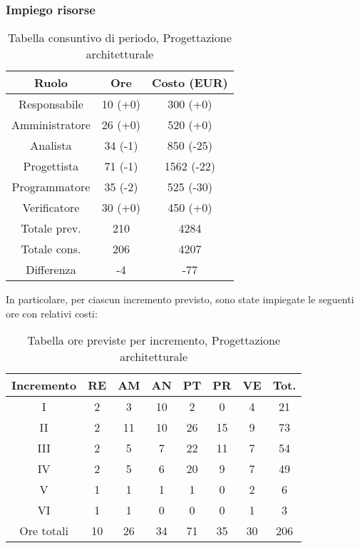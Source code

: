 \subsubsection{Impiego risorse}
\begin{table}[h]
\caption{Tabella consuntivo di periodo, Progettazione architetturale}  
\begin{center}
\begin{tabular}{ |c|c|c|  }
 \hline
 Ruolo 		& Ore & Costo (EUR)\\
 \hline\hline
	Responsabile	& 10 (+0) & 300 (+0)\\
	Amministratore	& 26 (+0) & 520 (+0)\\
	Analista		& 34 (-1) & 850 (-25)\\
	Progettista		& 71 (-1) & 1562 (-22)\\
	Programmatore	& 35 (-2) & 525 (-30)\\
	Verificatore	& 30 (+0) & 450 (+0)\\
	\hline\hline
	Totale prev.	& 210 & 4284 \\
	Totale cons.	& 206 & 4207 \\
	Differenza		& -4 & -77 \\
 \hline
\end{tabular}
\end{center}
\end{table}
\newpage
\noindent In particolare, per ciascun incremento previsto, sono state impiegate le seguenti ore con relativi costi:
\begin{table}[h]
	\caption{Tabella ore previste per incremento, Progettazione architetturale}  
	\begin{center}
		\begin{tabular}{ |c|c|c|c|c|c|c|c|  }
			\hline
			Incremento 		& RE 	& AM 	& AN 	& PT 	& PR 	& VE 	& Tot.\\
			\hline\hline
			I		& 2 		& 3			& 10 	& 2 	& 0 		& 4 		& 21\\
			II		& 2 		& 11 		& 10 	& 26	& 15 		& 9 		& 73\\
			III		& 2 		& 5 		& 7 	& 22	& 11 		& 7 		& 54\\
			IV		& 2 		& 5 		& 6 	& 20 	& 9 		& 7 		& 49\\
			V		& 1 		& 1 		& 1 	& 1		& 0 		& 2	 		& 6\\
			VI		& 1 		& 1 		& 0 	& 0 	& 0 		& 1 		& 3\\
			\hline\hline
			Ore totali		& 10		& 26		& 34 	& 71	 	& 35 	& 30 	& 206\\
			\hline
		\end{tabular}
	\end{center}
\end{table}


